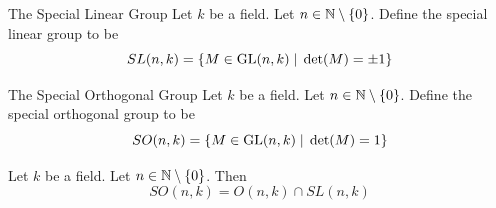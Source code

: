 \documentclass[a4paper]{article}
\begin{document}
\begin{defn}{The Special Linear Group}{} Let $k$ be a field. Let $n\in\mathbb{N}\setminus\{0\}$. Define the special linear group to be $$SL(n,k)=\{M\in\operatorname{GL}(n,k)\;|\;\det(M)=\pm1\}$$
\end{defn}

\begin{defn}{The Special Orthogonal Group}{} Let $k$ be a field. Let $n\in\mathbb{N}\setminus\{0\}$. Define the special orthogonal group to be $$SO(n,k)=\{M\in\operatorname{GL}(n,k)\;|\;\det(M)=1\}$$
\end{defn}

\begin{lmm}{}{} Let $k$ be a field. Let $n\in\mathbb{N}\setminus\{0\}$. Then $$SO(n,k)=O(n,k)\cap SL(n,k)$$
\end{lmm}
\end{document}
